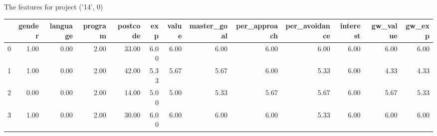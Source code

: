 \documentclass[7pt]{article}
\begin{document}
\begin{landscape}
The features for project ('14', 0)\newline
\begin{tabular}{lrrrrrrrrrrrr}
\toprule
{} &  gender &  language &  program &  postcode &  exp &  value &  master\_goal &  per\_approach &  per\_avoidance &  interest &  gw\_value &  gw\_exp \\
\midrule
0 &    1.00 &      0.00 &     2.00 &     33.00 & 6.00 &   6.00 &         6.00 &          6.00 &           6.00 &      6.00 &             6.00 &           6.00 \\
1 &    1.00 &      0.00 &     2.00 &     42.00 & 5.33 &   5.67 &         5.67 &          6.00 &           5.33 &      6.00 &             4.33 &           4.33 \\
2 &    0.00 &      0.00 &     2.00 &     14.00 & 5.00 &   5.00 &         5.33 &          5.67 &           5.67 &      6.00 &             5.67 &           5.33 \\
3 &    1.00 &      0.00 &     2.00 &     30.00 & 6.00 &   6.00 &         6.00 &          6.00 &           5.33 &      6.00 &             6.00 &           6.00 \\
\bottomrule
\end{tabular}
\end{landscape}
\end{document}
